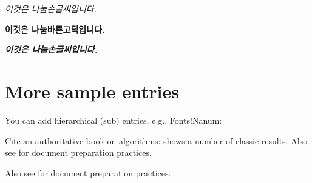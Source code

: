\documentclass[12pt]{book}
\begin{document}
  \textit{이것은 나눔손글씨입니다.}

  \textbf{이것은 나눔바른고딕입니다.}

  \textbf{\textit{이것은 나눔손글씨입니다.}}

  \section{More sample entries}
  You can add hierarchical (sub) entries, e.g., Fonts!Nanum:


  Cite an authoritative book on algorithms: \textcite{noauthor_help_2010} shows a number of classic results.
  Also see \parencite{kim_ssat-sat_2003} for document preparation practices.

  Also see \parencite{mega_computational_power} for document preparation practices.

  

  











  \backmatter
  \setlength{\parindent}{0pt} %
  \onesidedpaper
  
  \printbibliography[
    heading=bibintoc,   %
    title={References}
  ]
  \printindex                  %
  
  
\end{document}
